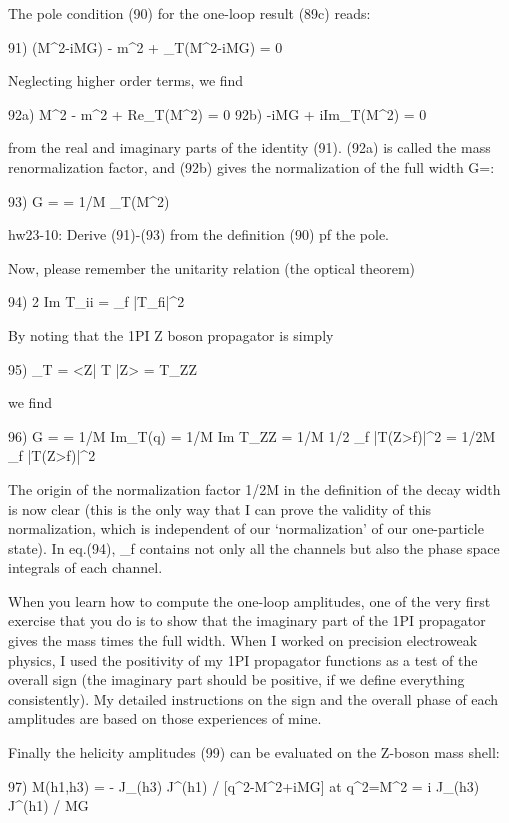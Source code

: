 \documentclass[12pt]{article}
\begin{document}
  The pole condition (90) for the one-loop result (89c) reads:

  91) (M^2-iMG) - m^2 + \Pi_T(M^2-iMG) = 0

  Neglecting higher order terms, we find

  92a) M^2 - m^2 + Re\Pi_T(M^2) = 0
  92b)     -iMG + iIm\Pi_T(M^2) = 0

  from the real and imaginary parts of the identity (91).  (92a) is called
  the mass renormalization factor, and (92b) gives the normalization of
  the full width G=\Gamma:

  93) G = \Gamma = 1/M \Im\Pi_T(M^2)

hw23-10: Derive (91)-(93) from the definition (90) pf the pole.

  Now, please remember the unitarity relation (the optical theorem)

  94) 2 Im T_ii = \Sum_f |T_fi|^2

  By noting that the 1PI Z boson propagator is simply

  95) \Pi_T = <Z| T |Z> = T_ZZ

  we find

  96) G = \Gamma = 1/M Im\Pi_T(q)
                 = 1/M Im{ T_ZZ }
                 = 1/M 1/2 \Sum_f |T(Z>f)|^2
                 = 1/2M \Sum_f |T(Z>f)|^2

  The origin of the normalization factor 1/2M in the definition of the
  decay width is now clear (this is the only way that I can prove the
  validity of this normalization, which is independent of our
  `normalization' of our one-particle state).  In eq.(94), \Sum_f contains
  not only all the channels but also the phase space integrals of each
  channel.

  When you learn how to compute the one-loop amplitudes, one of the very
  first exercise that you do is to show that the imaginary part of the
  1PI propagator gives the mass times the full width.  When I worked on
  precision electroweak physics, I used the positivity of my 1PI
  propagator functions as a test of the overall sign (the imaginary part
  should be positive, if we define everything consistently).  My detailed
  instructions on the sign and the overall phase of each amplitudes are
  based on those experiences of mine.

  Finally the helicity amplitudes (99) can be evaluated on the Z-boson
  mass shell:

  97) M(h1,h3) = - J_\mu(h3) J^\mu(h1) / [q^2-M^2+iMG]  at q^2=M^2
               = i J_\mu(h3) J^\mu(h1) / MG
\end{document}

